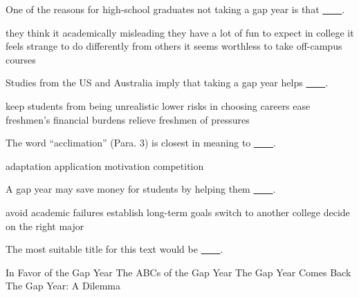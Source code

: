 \item One of the reasons for high-school graduates not taking a gap year is that \uline{~~~~}.
\begin{tasks}
	\task they think it academically misleading
	\task they have a lot of fun to expect in college
	\task it feels strange to do differently from others
	\task it seems worthless to take off-campus courses
\end{tasks}
\item Studies from the US and Australia imply that taking a gap year helps \uline{~~~~}.
\begin{tasks}
	\task keep students from being unrealistic
	\task lower risks in choosing careers
	\task ease freshmen's financial burdens
	\task relieve freshmen of pressures
\end{tasks}
\item The word ``acclimation'' (Para. 3) is closest in meaning to \uline{~~~~}.
\begin{tasks}
	\task adaptation
	\task application
	\task motivation
	\task competition
\end{tasks}
\item A gap year may save money for students by helping them \uline{~~~~}.
\begin{tasks}
	\task avoid academic failures
	\task establish long-term goals
	\task switch to another college
	\task decide on the right major
\end{tasks}
\item The most suitable title for this text would be \uline{~~~~}.
\begin{tasks}
	\task In Favor of the Gap Year
	\task The ABCs of the Gap Year
	\task The Gap Year Comes Back
	\task The Gap Year: A Dilemma
\end{tasks}